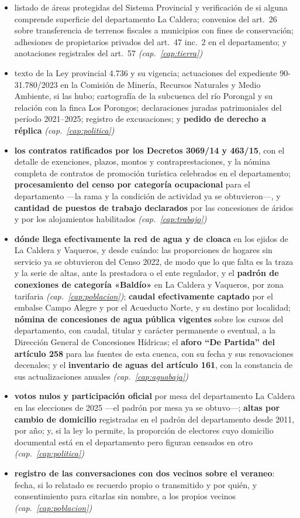\begin{itemize}[leftmargin=*]
\item listado de áreas protegidas del Sistema Provincial y verificación de si alguna comprende superficie del departamento La Caldera; convenios del art.\ 26 sobre transferencia de terrenos fiscales a municipios con fines de conservación; adhesiones de propietarios privados del art.\ 47 inc.\ 2 en el departamento; y anotaciones registrales del art.\ 57 \textit{(cap.\ \ref{cap:tierra})}
\item texto de la Ley provincial 4.736 y su vigencia; actuaciones del expediente 90-31.780/2023 en la Comisión de Minería, Recursos Naturales y Medio Ambiente, si las hubo; cartografía de la subcuenca del río Porongal y su relación con la finca Los Porongos; declaraciones juradas patrimoniales del período 2021--2025; registro de excusaciones; y \textbf{pedido de derecho a réplica} \textit{(cap.\ \ref{cap:politica})}
\item \textbf{los contratos ratificados por los Decretos 3069/14 y 463/15}, con el detalle
de exenciones, plazos, montos y contraprestaciones, y la nómina completa de contratos de
promoción turística celebrados en el departamento; \textbf{procesamiento del censo por categoría ocupacional} para el departamento ---la rama y la condición de actividad ya se obtuvieron---, y \textbf{cantidad de puestos de
trabajo declarados} por las concesiones de áridos y por los alojamientos habilitados \textit{(cap.\ \ref{cap:trabajo})}
\item \textbf{dónde llega efectivamente la red de agua y de cloaca} en los ejidos de La
Caldera y Vaqueros, y desde cuándo: las proporciones de hogares sin servicio ya se obtuvieron del
Censo 2022, de modo que lo que falta es la traza y la serie de altas, ante la prestadora o el
ente regulador, y el \textbf{padrón de conexiones de categoría «Baldío»} en La Caldera y Vaqueros, por zona tarifaria \textit{(cap.\ \ref{cap:poblacion})}; \textbf{caudal
efectivamente captado} por el embalse Campo Alegre y por el Acueducto Norte, y su destino por
localidad; \textbf{nómina de concesiones de agua pública vigentes} sobre los cursos del
departamento, con caudal, titular y carácter permanente o eventual, a la Dirección General de Concesiones Hídricas; el \textbf{aforo ``De
Partida'' del artículo 258} para las fuentes de esta cuenca, con su fecha y sus renovaciones
decenales; y el \textbf{inventario de aguas del artículo 161}, con la constancia de sus
actualizaciones anuales \textit{(cap.\ \ref{cap:aguabaja})}
\item \textbf{votos nulos y participación oficial} por mesa del departamento La Caldera en las elecciones de 2025 ---el padrón por mesa ya se obtuvo---; \textbf{altas por cambio de domicilio} registradas en el padrón del departamento desde 2011, por año; y, si la ley lo permite, la proporción de electores cuyo domicilio documental está en el departamento pero figuran censados en otro \textit{(cap.\ \ref{cap:politica})}
\item \textbf{registro de las conversaciones con dos vecinos sobre el veraneo}: fecha, si lo relatado es recuerdo propio o transmitido y por quién, y consentimiento para citarlas sin nombre, a los propios vecinos \textit{(cap.\ \ref{cap:poblacion})}
\end{itemize}
